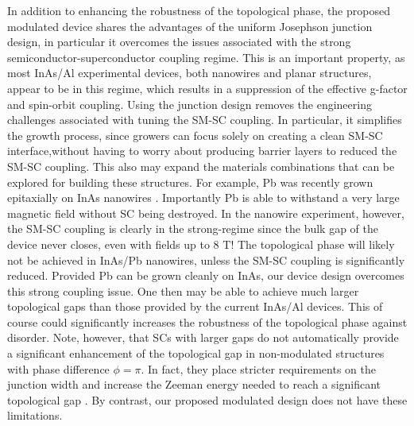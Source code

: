 \documentclass[twocolumn,aps,prb,nofootinbib]{revtex4-2}
\begin{document}
In addition to enhancing the robustness of the topological phase, the proposed modulated device shares the advantages of the uniform Josephson junction design, in particular it overcomes the issues associated with the strong semiconductor-superconductor coupling regime. This is an important property, as most InAs/Al experimental devices, both nanowires and planar structures, appear to be in this regime, which results in a suppression of the effective g-factor and spin-orbit coupling.
 Using the junction design removes the engineering challenges associated with tuning the SM-SC coupling. In particular, it simplifies the growth process, since growers can focus solely on creating a clean SM-SC interface,without having to worry about producing barrier layers to reduced the SM-SC coupling. 
 This also may expand the materials combinations that can be explored for building these structures. For example, Pb was recently grown epitaxially on InAs nanowires \cite{Kanne2020}. Importantly Pb is able to withstand a very large magnetic field without SC being destroyed. In the nanowire experiment, however, the SM-SC coupling is clearly in the strong-regime since the bulk gap of the device never closes, even with fields up to 8 $\text{T}$! The topological phase will likely not be achieved in InAs/Pb nanowires, unless the SM-SC coupling is significantly reduced. Provided Pb can be grown cleanly on InAs, our device design overcomes this strong coupling issue. One then may be able to achieve much larger topological gaps than those provided by the  current InAs/Al devices. This of course could significantly increases the robustness of the topological phase against disorder. Note, however, that SCs with larger gaps do not automatically provide a significant enhancement of the topological gap in non-modulated structures with phase difference $\phi=\pi$. In fact, they place stricter requirements on the junction width and increase the Zeeman energy needed to reach a significant topological gap \cite{Pientka2017}. By contrast, our proposed modulated design does not have these limitations.
\end{document}
